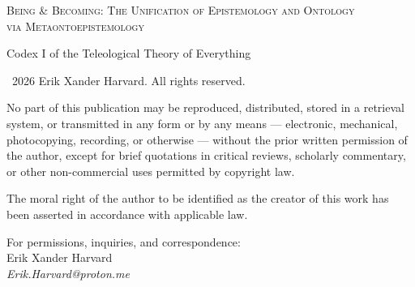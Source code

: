 \documentclass[10pt, openany, oneside]{book}
\renewcommand{\small}{\fontsize{9}{11.5}\selectfont}
\begin{document}

\thispagestyle{empty}
\vspace*{\fill}

\begin{center}

{\scshape Being \& Becoming: The Unification of Epistemology and Ontology\\via Metaontoepistemology}

\vspace{1em}

{\small Codex I of the Teleological Theory of Everything}

\end{center}

\vspace{1.5em}

{\small
\noindent \textcopyright\ 2026 Erik Xander Harvard. All rights reserved.

\vspace{0.8em}

\noindent No part of this publication may be reproduced, distributed, stored in a retrieval system, or transmitted in any form or by any means --- electronic, mechanical, photocopying, recording, or otherwise --- without the prior written permission of the author, except for brief quotations in critical reviews, scholarly commentary, or other non-commercial uses permitted by copyright law.

\vspace{0.8em}

\noindent The moral right of the author to be identified as the creator of this work has been asserted in accordance with applicable law.

\vspace{0.8em}

\noindent For permissions, inquiries, and correspondence:\\
Erik Xander Harvard\\
\textit{Erik.Harvard@proton.me}
}

\vspace{1.5em}
\end{document}
